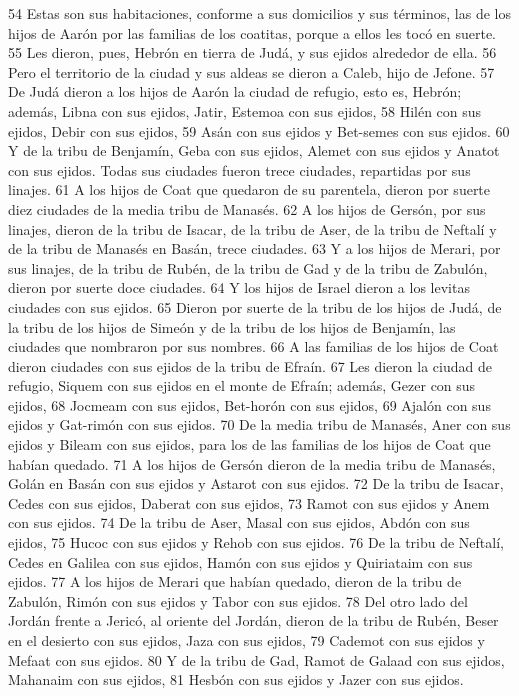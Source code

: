  
54 Estas son sus habitaciones, conforme a sus domicilios y sus términos, las de los hijos de Aarón por las familias de los coatitas, porque a ellos les tocó en suerte.
55 Les dieron, pues, Hebrón en tierra de Judá, y sus ejidos alrededor de ella.
56 Pero el territorio de la ciudad y sus aldeas se dieron a Caleb, hijo de Jefone.
57 De Judá dieron a los hijos de Aarón la ciudad de refugio, esto es, Hebrón; además, Libna con sus ejidos, Jatir, Estemoa con sus ejidos,
58 Hilén con sus ejidos, Debir con sus ejidos,
59 Asán con sus ejidos y Bet-semes con sus ejidos.
60 Y de la tribu de Benjamín, Geba con sus ejidos, Alemet con sus ejidos y Anatot con sus ejidos. Todas sus ciudades fueron trece ciudades, repartidas por sus linajes.
61 A los hijos de Coat que quedaron de su parentela, dieron por suerte diez ciudades de la media tribu de Manasés.
62 A los hijos de Gersón, por sus linajes, dieron de la tribu de Isacar, de la tribu de Aser, de la tribu de Neftalí y de la tribu de Manasés en Basán, trece ciudades.
63 Y a los hijos de Merari, por sus linajes, de la tribu de Rubén, de la tribu de Gad y de la tribu de Zabulón, dieron por suerte doce ciudades.
64 Y los hijos de Israel dieron a los levitas ciudades con sus ejidos.
65 Dieron por suerte de la tribu de los hijos de Judá, de la tribu de los hijos de Simeón y de la tribu de los hijos de Benjamín, las ciudades que nombraron por sus nombres.
66 A las familias de los hijos de Coat dieron ciudades con sus ejidos de la tribu de Efraín.
67 Les dieron la ciudad de refugio, Siquem con sus ejidos en el monte de Efraín; además, Gezer con sus ejidos,
68 Jocmeam con sus ejidos, Bet-horón con sus ejidos,
69 Ajalón con sus ejidos y Gat-rimón con sus ejidos.
70 De la media tribu de Manasés, Aner con sus ejidos y Bileam con sus ejidos, para los de las familias de los hijos de Coat que habían quedado.
71 A los hijos de Gersón dieron de la media tribu de Manasés, Golán en Basán con sus ejidos y Astarot con sus ejidos.
72 De la tribu de Isacar, Cedes con sus ejidos, Daberat con sus ejidos,
73 Ramot con sus ejidos y Anem con sus ejidos.
74 De la tribu de Aser, Masal con sus ejidos, Abdón con sus ejidos,
75 Hucoc con sus ejidos y Rehob con sus ejidos.
76 De la tribu de Neftalí, Cedes en Galilea con sus ejidos, Hamón con sus ejidos y Quiriataim con sus ejidos.
77 A los hijos de Merari que habían quedado, dieron de la tribu de Zabulón, Rimón con sus ejidos y Tabor con sus ejidos.
78 Del otro lado del Jordán frente a Jericó, al oriente del Jordán, dieron de la tribu de Rubén, Beser en el desierto con sus ejidos, Jaza con sus ejidos,
79 Cademot con sus ejidos y Mefaat con sus ejidos.
80 Y de la tribu de Gad, Ramot de Galaad con sus ejidos, Mahanaim con sus ejidos,
81 Hesbón con sus ejidos y Jazer con sus ejidos.

